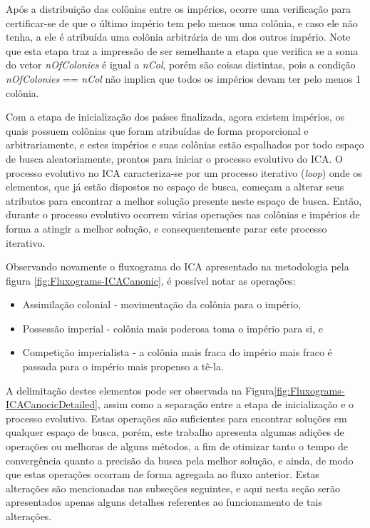 Após a distribuição das colônias entre os impérios, ocorre uma verificação para certificar-se de que o último império tem pelo menos uma colônia, e caso ele não tenha, a ele é atribuída uma colônia arbitrária de um dos outros império. Note que esta etapa traz a impressão de ser semelhante a etapa que verifica se a soma do vetor \emph{nOfColonies} é igual a \emph{nCol}, porém são coisas distintas, pois a condição \emph{nOfColonies} == \emph{nCol} não implica que todos os impérios devam ter pelo menos 1 colônia. 

Com a etapa de inicialização dos países finalizada, agora existem impérios, os quais possuem colônias que foram atribuídas de forma proporcional e arbitrariamente, e estes impérios e suas colônias estão espalhados por todo espaço de busca aleatoriamente, prontos para iniciar o processo evolutivo do ICA. O processo evolutivo no ICA caracteriza-se por um processo iterativo (\emph{loop}) onde os elementos, que já estão dispostos no espaço de busca, começam a alterar seus atributos para encontrar a melhor solução presente neste espaço de busca. Então, durante o processo evolutivo ocorrem várias operações nas colônias  e impérios de forma a atingir a melhor solução, e consequentemente parar este processo iterativo. 

Observando novamente o fluxograma do ICA apresentado na metodologia pela figura \ref{fig:Fluxograms-ICACanonic}, é possível notar as operações:
\begin{itemize}
\item Assimilação colonial - movimentação da colônia para o império,
\item Possessão imperial - colônia mais poderosa toma o império para si, e
\item Competição imperialista - a colônia mais fraca do império mais fraco é passada para o império mais propenso a tê-la.
\end{itemize}

A delimitação destes elementos pode ser observada na Figura\ref{fig:Fluxograms-ICACanocicDetailed}, assim como a separação entre a etapa de inicialização e o processo evolutivo. Estas operações são suficientes para encontrar soluções em qualquer espaço de busca, porém, este trabalho apresenta algumas adições de operações  ou melhoras de alguns métodos, a fim de otimizar tanto o tempo de convergência quanto a precisão da busca pela melhor solução, e ainda, de modo que estas operações ocorram de forma agregada ao fluxo anterior. Estas alterações são mencionadas nas subseções seguintes, e aqui nesta seção serão apresentados apenas alguns detalhes referentes ao funcionamento de tais alterações. 

